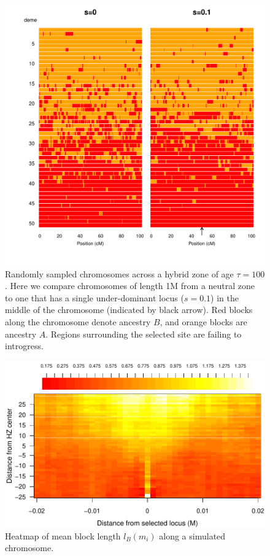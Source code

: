 \begin{figure}
\includegraphics[width=\textwidth]{figs/plot_chromosomes_tau100}
\caption{Randomly sampled chromosomes  across a hybrid zone of age $\tau=100$. Here we compare chromosomes of length 1M from a neutral zone to one that has a single under-dominant locus ($s=0.1$) in the middle of the chromosome (indicated by black arrow). Red blocks along the chromosome denote ancestry $B$, and orange blocks are ancestry $A$. Regions surrounding the selected site are failing to introgress.
 }\label{Fig:resistanceToIntrogression100g}
\end{figure}


\begin{figure}
\includegraphics{figs/blocksAlongChromHeatmapAncBConditioning}
\caption{Heatmap of mean block length $l_B(m_i)$ along a simulated chromosome. }\label{Supp:blockLengthHeatmap}
\end{figure}




